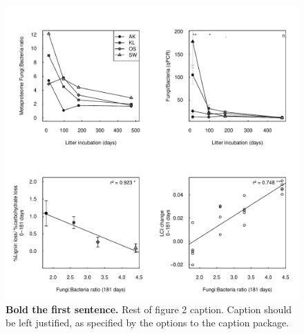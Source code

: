 \documentclass[10pt]{article}
\begin{document}
\begin{figure}[!ht]
\begin{center}
\includegraphics{plosone-f2bnew}
\end{center}
\caption{
{\bf Bold the first sentence.}  Rest of figure 2  caption.  Caption 
should be left justified, as specified by the options to the caption 
package.
}
\label{Figure_label}
\end{figure}
\end{document}
